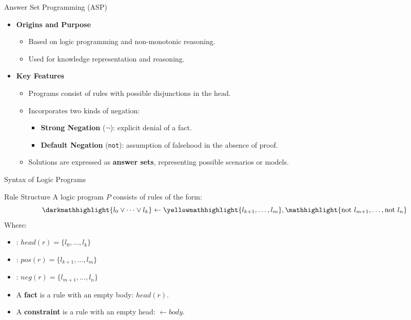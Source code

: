 \begin{frame}{Answer Set Programming (ASP)}
    \begin{itemize}
        \item \textbf{Origins and Purpose}
              \begin{itemize}
                  \item Based on logic programming and non-monotonic reasoning.
                  \item Used for knowledge representation and reasoning.
              \end{itemize}
        \item \textbf{Key Features}
              \begin{itemize}
                  \item Programs consist of rules with possible disjunctions in the head.
                  \item Incorporates two kinds of negation:
                        \begin{itemize}
                            \item \textbf{Strong Negation} ($\neg$): explicit denial of a fact.
                            \item \textbf{Default Negation} (\texttt{not}): assumption of falsehood in the absence of proof.
                        \end{itemize}
                  \item Solutions are expressed as \textbf{answer sets}, representing possible scenarios or models.
              \end{itemize}
    \end{itemize}
\end{frame}

\begin{frame}{Syntax of Logic Programs}
    \begin{alertblock}{Rule Structure}
        A logic program \(P\) consists of rules of the form:
        \[
            \darkmathhighlight{l_0 \lor \dots \lor l_k} \leftarrow \yellowmathhighlight{l_{k+1}, \dots, l_m}, \mathhighlight{\text{not }l_{m+1}, \dots, \text{not }l_n}
        \]
        Where:
        \begin{itemize}
            \item {}: \(head(r) = \{l_0, \dots, l_k\}\)
            \item {}: \(pos(r) = \{l_{k+1}, \dots, l_m\}\)
            \item {}: \(neg(r) = \{l_{m+1}, \dots, l_n\}\)
        \end{itemize}
    \end{alertblock}
    \begin{itemize}
        \item A \textbf{fact} is a rule with an empty body: \(head(r).\)
        \item A \textbf{constraint} is a rule with an empty head: \(\leftarrow body.\)
    \end{itemize}
\end{frame}

